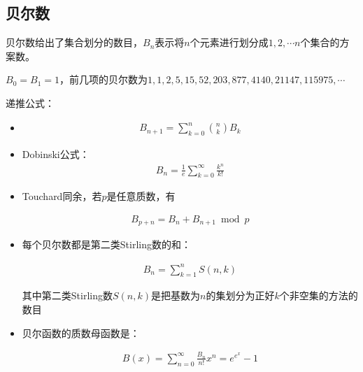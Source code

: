 \subsection{贝尔数}
贝尔数给出了集合划分的数目，$B_n$表示将$n$个元素进行划分成$1, 2, \cdots n$个集合的方案数。\par
$B_0 = B_1 = 1$，前几项的贝尔数为$1, 1, 2, 5, 15, 52, 203, 877, 4140, 21147, 115975, \cdots$\par
递推公式：\par
\begin{itemize}
\item 
\begin{eqnarray*}
B_{n + 1} = \sum\limits_{k = 0}^n {n \choose k} B_k
\end{eqnarray*} \par
\item Dobinski公式：
\begin{eqnarray*}
B_n = \frac{1}{e} \sum\limits_{k = 0}^{\infty} \frac{k^n}{k!}
\end{eqnarray*} \par
\item Touchard同余，若$p$是任意质数，有\par
\begin{eqnarray*}
B_{p + n} = B_n + B_{n + 1} \bmod p
\end{eqnarray*} \par
\item 每个贝尔数都是第二类Stirling数的和：\par
\begin{eqnarray*}
B_n = \sum\limits_{k = 1}^n S(n, k)
\end{eqnarray*} \par
其中第二类Stirling数$S(n, k)$是把基数为$n$的集划分为正好$k$个非空集的方法的数目\par
\item 贝尔函数的质数母函数是：\par
\begin{eqnarray*}
B(x) = \sum\limits_{n = 0}^{\infty} \frac{B_n}{n!}x^n = e^{e^x} - 1
\end{eqnarray*} \par
\end{itemize}
	
